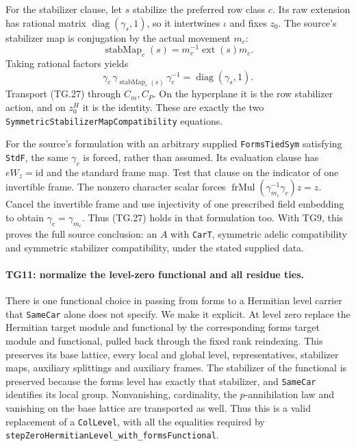 \documentclass[11pt,a4paper]{article}
\numberwithin{equation}{section}
\theoremstyle{remark}\newtheorem{remark}[theorem]{Remark}
\begin{document}
For the stabilizer clause, let $s$ stabilize the preferred row
class $c$. Its raw extension has rational matrix
$\operatorname{diag}(\gamma_s,1)$, so it intertwines $\iota$
and fixes $z_0$. The source's stabilizer map is conjugation by
the actual movement $m_c$:
\[
 \operatorname{stabMap}_c(s)=m_c^{-1}\operatorname{ext}(s)m_c.
 \tag{TG.26}
\]
Taking rational factors yields
\[
 \gamma_c\,\gamma_{\operatorname{stabMap}_c(s)}\,
                      \gamma_c^{-1}
       =\operatorname{diag}(\gamma_s,1).
 \tag{TG.27}
\]
Transport (TG.27) through $C_m,C_P$. On the hyperplane it is
the row stabilizer action, and on $z_0^H$ it is the identity.
These are exactly the two
\texttt{SymmetricStabilizerMapCompatibility} equations.

For the source's formulation with an arbitrary supplied
\texttt{FormsTiedSym} satisfying \texttt{StdF}, the same
$\gamma_c$ is forced, rather than assumed. Its evaluation
clause has $eW_z=\mathrm{id}$ and the standard frame map.
Test that clause on the indicator of one invertible frame.
The nonzero character scalar forces
$\operatorname{frMul}(\gamma_{m_c}^{-1}\gamma_c)z=z$.
Cancel the invertible frame and use injectivity of one prescribed
field embedding to obtain $\gamma_c=\gamma_{m_c}$. Thus
(TG.27) holds in that formulation too. With TG9, this proves
the full source conclusion: an $A$ with \texttt{CarT},
symmetric adelic compatibility and symmetric stabilizer
compatibility, under the stated supplied data.

\paragraph{TG11: normalize the level-zero functional and all residue ties.}
There is one functional choice in passing from forms to a
Hermitian level carrier that \texttt{SameCar} alone does not
specify. We make it explicit. At level zero replace the
Hermitian target module and functional by the corresponding
forms target module and functional, pulled back through the
fixed rank reindexing. This preserves its base lattice, every
local and global level, representatives, stabilizer maps,
auxiliary splittings and auxiliary frames. The stabilizer of
the functional is preserved because the forms level has
exactly that stabilizer, and \texttt{SameCar} identifies its
local group. Nonvanishing, cardinality, the $p$-annihilation
law and vanishing on the base lattice are transported as well.
Thus this is a valid replacement of a \texttt{ColLevel},
with all the equalities required by
\texttt{stepZeroHermitianLevel\_\allowbreak with\_\allowbreak formsFunctional}.
\end{document}
